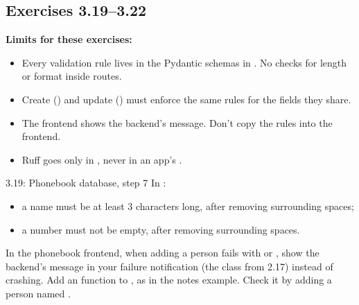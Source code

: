 \subsection{Exercises 3.19--3.22}

\textbf{Limits for these exercises:}
\begin{itemize}
\item Every validation rule lives in the Pydantic schemas in . No  checks for length or format inside routes.
\item Create () and update () must enforce the same rules for the fields they share.
\item The frontend shows the backend's message. Don't copy the rules into the frontend.
\item Ruff goes only in , never in an app's .
\end{itemize}

\begin{exercise}{3.19: Phonebook database, step 7}
In :
\begin{itemize}
\item a name must be at least 3 characters long, after removing surrounding spaces;
\item a number must not be empty, after removing surrounding spaces.
\end{itemize}
In the phonebook frontend, when adding a person fails with  or , show the backend's message in your failure notification (the  class from 2.17) instead of crashing. Add an  function to , as in the notes example. Check it by adding a person named .
\end{exercise}

